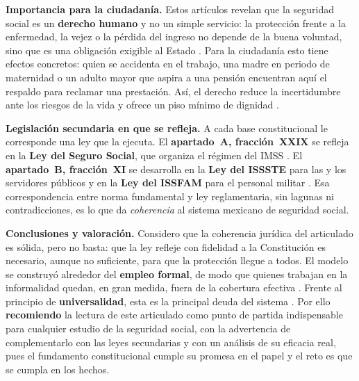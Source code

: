 \documentclass[12pt,letterpaper,oneside]{article}
\begin{document}
\begin{resenabox}
\textbf{Importancia para la ciudadan\'ia.} Estos art\'iculos revelan que la seguridad social es un \textbf{derecho humano} y no un simple servicio: la protecci\'on frente a la enfermedad, la vejez o la p\'erdida del ingreso no depende de la buena voluntad, sino que es una obligaci\'on exigible al Estado \citep{belmontLugoParra2017,ibarraOlguin2022}. Para la ciudadan\'ia esto tiene efectos concretos: quien se accidenta en el trabajo, una madre en periodo de maternidad o un adulto mayor que aspira a una pensi\'on encuentran aqu\'i el respaldo para reclamar una prestaci\'on. As\'i, el derecho reduce la incertidumbre ante los riesgos de la vida y ofrece un piso m\'inimo de dignidad \citep{hernandezInclusion2020}.

\textbf{Legislaci\'on secundaria en que se refleja.} A cada base constitucional le corresponde una ley que la ejecuta. El \textbf{apartado~A, fracci\'on~XXIX} se refleja en la \textbf{Ley del Seguro Social}, que organiza el r\'egimen del IMSS \citep{lss2026}. El \textbf{apartado~B, fracci\'on~XI} se desarrolla en la \textbf{Ley del ISSSTE} para las y los servidores p\'ublicos \citep{lissste2026} y en la \textbf{Ley del ISSFAM} para el personal militar \citep{lissfam2026}. Esa correspondencia entre norma fundamental y ley reglamentaria, sin lagunas ni contradicciones, es lo que da \emph{coherencia} al sistema mexicano de seguridad social.

\textbf{Conclusiones y valoraci\'on.} Considero que la coherencia jur\'idica del articulado es s\'olida, pero no basta: que la ley refleje con fidelidad a la Constituci\'on es necesario, aunque no suficiente, para que la protecci\'on llegue a todos. El modelo se construy\'o alrededor del \textbf{empleo formal}, de modo que quienes trabajan en la informalidad quedan, en gran medida, fuera de la cobertura efectiva \citep{gonzalezCarvallo2024,moralesFajardo2021}. Frente al principio de \textbf{universalidad}, esta es la principal deuda del sistema \citep{acnudhSeguridadSocial2026}. Por ello \textbf{recomiendo} la lectura de este articulado como punto de partida indispensable para cualquier estudio de la seguridad social, con la advertencia de complementarlo con las leyes secundarias y con un an\'alisis de su eficacia real, pues el fundamento constitucional cumple su promesa en el papel y el reto es que se cumpla en los hechos.
\end{resenabox}

\clearpage
\end{document}
